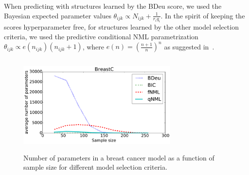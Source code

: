When predicting with structures learned by the BDeu score, we used the
Bayesian expected parameter values $\theta_{ijk} \propto
N_{ijk}+\frac{1}{r_iq_i}$.  In the spirit of keeping the scores
hyperparameter free, for structures learned by the other model
selection criteria, we used the predictive conditional NML
parametrization $\theta_{ijk}\propto e(n_{ijk})(n_{ijk}+1)$, where
$e(n)=(\frac{n+1}{n})^n$ as suggested in~\cite{Riss07b}.

\begin{figure}
\centering
\includegraphics[width=8cm,height=5cm]{qNML_images/breast_cancer_npmean.pdf}
\caption{Number of parameters in a breast cancer model as a function
  of sample size for different model selection criteria.}
\label{fig:bcnpmean}
\end{figure}

